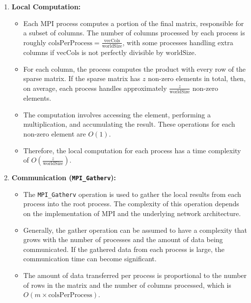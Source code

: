 \documentclass[12pt,oneside]{book} %
\begin{document}
\begin{enumerate}
    \item \textbf{Local Computation:}
          \begin{itemize}
              \item Each MPI process computes a portion of the final matrix, responsible for a
                    subset of columns. The number of columns processed by each process is roughly
                    \( \text{colsPerProcess} = \frac{\text{vecCols}}{\text{worldSize}} \), with
                    some processes handling extra columns if \( \text{vecCols} \) is not perfectly
                    divisible by \( \text{worldSize} \).
              \item For each column, the process computes the product with every row of the sparse
                    matrix. If the sparse matrix has \( z \) non-zero elements in total, then, on
                    average, each process handles approximately \( \frac{z}{\text{worldSize}} \)
                    non-zero elements.
              \item The computation involves accessing the element, performing a multiplication,
                    and accumulating the result. These operations for each non-zero element are \(
                    O(1) \).
              \item Therefore, the local computation for each process has a time complexity of \(
                    O\left(\frac{z}{\text{worldSize}}\right) \).
          \end{itemize}

    \item \textbf{Communication (\texttt{MPI\_Gatherv}):}
          \begin{itemize}
              \item The \texttt{MPI\_Gatherv} operation is used to gather the local results from
                    each process into the root process. The complexity of this operation depends on
                    the implementation of MPI and the underlying network architecture.
              \item Generally, the gather operation can be assumed to have a complexity that grows
                    with the number of processes and the amount of data being communicated. If the
                    gathered data from each process is large, the communication time can become
                    significant.
              \item The amount of data transferred per process is proportional to the number of
                    rows in the matrix and the number of columns processed, which is \( O(m \times
                    \text{colsPerProcess}) \).
          \end{itemize}


\end{enumerate}
\end{document}
